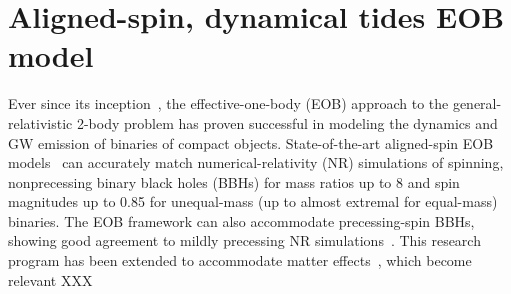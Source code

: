 \documentclass[prd,aps,letter,twocolumn,floatfix,notitlepage]{revtex4-1}
\begin{document}
\section{Aligned-spin, dynamical tides EOB model}
Ever since its inception~\cite{Buonanno:1998gg}, the effective-one-body (EOB) approach to the general-relativistic 2-body problem has proven successful in modeling the dynamics and GW emission of binaries of compact objects. State-of-the-art aligned-spin EOB models~\cite{Bohe:2016gbl,Nagar:2017jdw} can accurately match numerical-relativity (NR) simulations of spinning, nonprecessing binary black holes (BBHs) for mass ratios up to 8 and spin magnitudes up to 0.85 for unequal-mass (up to almost extremal for equal-mass) binaries. The EOB framework can also accommodate precessing-spin BBHs, showing good agreement to mildly precessing NR simulations~\cite{Babak:2016tgq}. This research program has been extended to accommodate matter effects~\cite{}, which become relevant XXX
\end{document}
